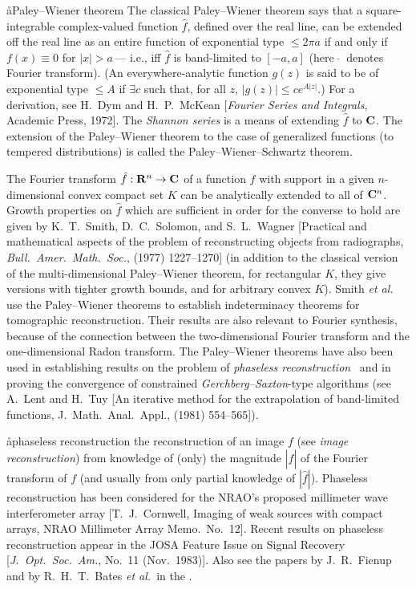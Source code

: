 \aa{Paley--Wiener theorem}
The classical Paley--Wiener theorem says that a square-integrable
complex-valued function $\hat f$, defined over the real line,
can be extended off the real line as an entire function of
exponential type $\le 2\pi a$ if and only if $f(x)\equiv0$ for $|x|>a\,$---%
i.e., iff $\hat f$ is band-limited to $[-a,a]$
(here $\ \hat{}\ $ denotes Fourier transform).
(An everywhere-analytic function $g(z)$ is said to be of exponential type
$\le A$ if $\exists c$ such that, for all $z$, $|g(z)|\le ce^{A|z|}$.)
For a derivation, see H.~Dym and H.~P.~McKean
[{\it Fourier Series and Integrals}\/, Academic Press, 1972].
The {\it Shannon series}\/ is a means of extending $\hat f$ to $\bold C$.
The extension of the Paley--Wiener theorem to the case of generalized
functions (to tempered distributions) is called the Paley--Wiener--Schwartz
theorem.
\par
The Fourier transform $\hat f:\bold R^n\to\bold C$ of a function $f$
with support in a given $n$-dimensional convex compact set $K$
can be analytically extended to all of $\bold C^n$.
Growth properties on $\hat f$ which are sufficient in order for the
converse to hold are given by K.~T.~Smith, D.~C.~Solomon, and S.~L.~Wagner
[Practical and mathematical aspects of the problem of reconstructing
objects from radiographs, {\it Bull.\ Amer.\ Math.\ Soc.}, 
(1977) 1227--1270] (in addition to the classical version of the
multi-dimensional Paley--Wiener theorem, for rectangular $K$,
they give versions with tighter growth bounds, and for arbitrary convex $K$).
Smith {\it et al.}\/ use the Paley--Wiener theorems to establish
indeterminacy theorems for tomographic reconstruction.
Their results are also relevant to Fourier synthesis, because of the
connection between the two-dimensional Fourier transform and the
one-dimensional Radon transform.
The Paley--Wiener theorems have also been used in establishing results
on the problem of {\it phaseless reconstruction} \qv\
and in proving the convergence of constrained {\it Gerchberg--Saxton}\/-type
algorithms (see A.~Lent and H.~Tuy [An iterative method for the
extrapolation of band-limited functions, J.~Math.\ Anal.\ Appl.,
\bold{83} (1981) 554--565]).

\aa{phaseless reconstruction}
the reconstruction of an image $f$ (see {\it image reconstruction}\/)
from knowledge of (only) the magnitude $|\hat f|$ of the Fourier transform
of $f$ (and usually from only partial knowledge of $|\hat f|$).
Phaseless reconstruction has been considered for the NRAO's proposed
millimeter wave interferometer array [T.~J.~Cornwell, Imaging of weak
sources with compact arrays, NRAO Millimeter Array Memo.\ No.~12].
Recent results on phaseless reconstruction appear in the JOSA
Feature Issue on Signal Recovery
[{\it J.~Opt.\ Soc.~Am.},  No.~11 (Nov.\ 1983)].
Also see the papers by J.~R.~Fienup and by R.~H.~T.~Bates
{\it et al.}\ in the \sydp.

